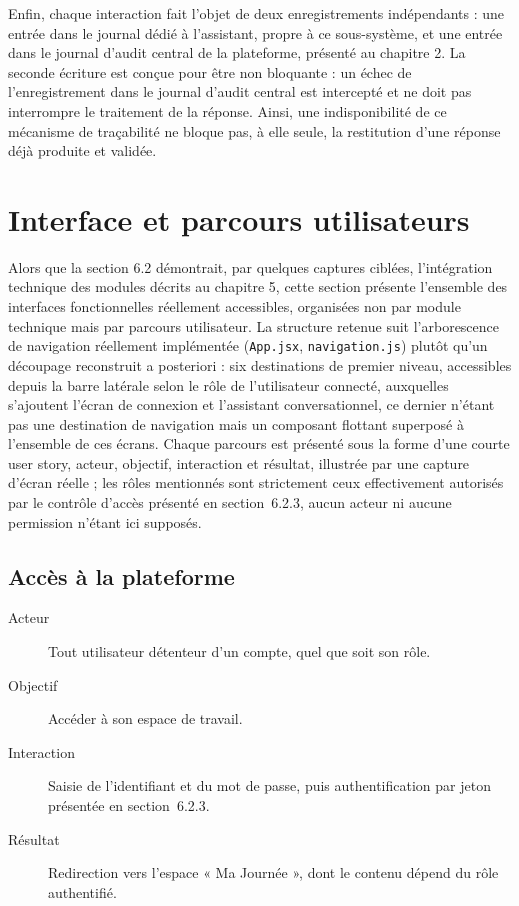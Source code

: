 Enfin, chaque interaction fait l'objet de deux enregistrements indépendants : une entrée dans le journal dédié à l'assistant, propre à ce sous-système, et une entrée dans le journal d'audit central de la plateforme, présenté au chapitre 2. La seconde écriture est conçue pour être non bloquante : un échec de l'enregistrement dans le journal d'audit central est intercepté et ne doit pas interrompre le traitement de la réponse. Ainsi, une indisponibilité de ce mécanisme de traçabilité ne bloque pas, à elle seule, la restitution d'une réponse déjà produite et validée.

\section{Interface et parcours utilisateurs}

Alors que la section 6.2 démontrait, par quelques captures ciblées, l'intégration technique des modules décrits au chapitre 5, cette section présente l'ensemble des interfaces fonctionnelles réellement accessibles, organisées non par module technique mais par parcours utilisateur. La structure retenue suit l'arborescence de navigation réellement implémentée (\texttt{App.jsx}, \texttt{navigation.js}) plutôt qu'un découpage reconstruit a posteriori : six destinations de premier niveau, accessibles depuis la barre latérale selon le rôle de l'utilisateur connecté, auxquelles s'ajoutent l'écran de connexion et l'assistant conversationnel, ce dernier n'étant pas une destination de navigation mais un composant flottant superposé à l'ensemble de ces écrans. Chaque parcours est présenté sous la forme d'une courte user story, acteur, objectif, interaction et résultat, illustrée par une capture d'écran réelle ; les rôles mentionnés sont strictement ceux effectivement autorisés par le contrôle d'accès présenté en section~6.2.3, aucun acteur ni aucune permission n'étant ici supposés.

\subsection{Accès à la plateforme}

\begin{description}
\item[Acteur] Tout utilisateur détenteur d'un compte, quel que soit son rôle.
\item[Objectif] Accéder à son espace de travail.
\item[Interaction] Saisie de l'identifiant et du mot de passe, puis authentification par jeton présentée en section~6.2.3.
\item[Résultat] Redirection vers l'espace « Ma Journée », dont le contenu dépend du rôle authentifié.
\end{description}

